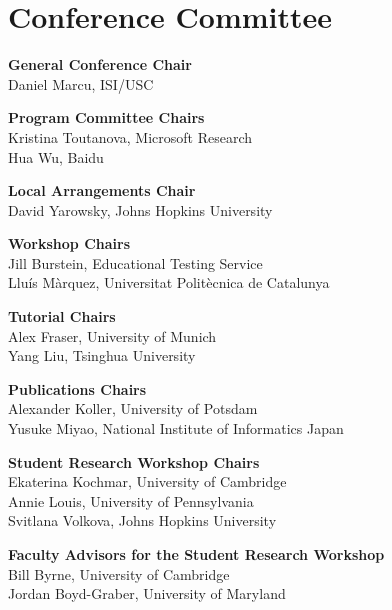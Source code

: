 \markboth{}{} %
\markright{}{} %

\section{Conference Committee}{}

\setlength{\parindent}{0pt}

{\bf General Conference Chair} \\
Daniel Marcu, ISI/USC \\

{\bf Program Committee Chairs} \\
Kristina Toutanova, Microsoft Research \\
Hua Wu, Baidu \\

{\bf Local Arrangements Chair} \\
David Yarowsky, Johns Hopkins University \\

{\bf Workshop Chairs} \\
Jill Burstein, Educational Testing Service \\
Lluís Màrquez, Universitat Politècnica de Catalunya \\

{\bf Tutorial Chairs} \\
Alex Fraser, University of Munich \\
Yang Liu, Tsinghua University \\

{\bf Publications Chairs} \\
Alexander Koller, University of Potsdam \\
Yusuke Miyao, National Institute of Informatics Japan \\

{\bf Student Research Workshop Chairs} \\
Ekaterina Kochmar, University of Cambridge \\
Annie Louis, University of Pennsylvania \\
Svitlana Volkova, Johns Hopkins University \\

{\bf Faculty Advisors for the Student Research Workshop} \\
Bill Byrne, University of Cambridge \\
Jordan Boyd-Graber, University of Maryland \\

